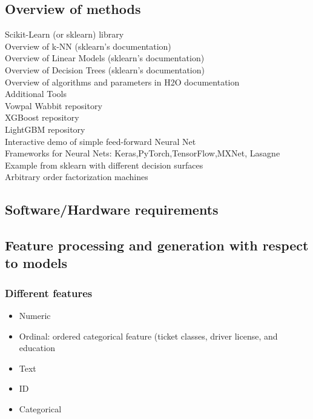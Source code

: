 \documentclass[11pt, twoside]{article}   	%
\begin{document}
\subsection{Overview of methods}
\textup{}Scikit-Learn (or sklearn) library
\\Overview of k-NN (sklearn's documentation)
\\Overview of Linear Models (sklearn's documentation)
\\Overview of Decision Trees (sklearn's documentation)
\\Overview of algorithms and parameters in H2O documentation
\\Additional Tools
\\Vowpal Wabbit repository
\\XGBoost repository
\\LightGBM repository
\\Interactive demo of simple feed-forward Neural Net
\\Frameworks for Neural Nets: Keras,PyTorch,TensorFlow,MXNet, Lasagne
\\Example from sklearn with different decision surfaces
\\Arbitrary order factorization machines

\subsection{Software/Hardware requirements}


\subsection{Feature processing and generation with respect to models}
\subsubsection{Different features}
\begin{itemize}
  \item Numeric
  \item Ordinal: ordered categorical feature (ticket classes, driver license, and education
  \item Text
  \item ID 
  \item Categorical
\end{itemize}
\end{document}

